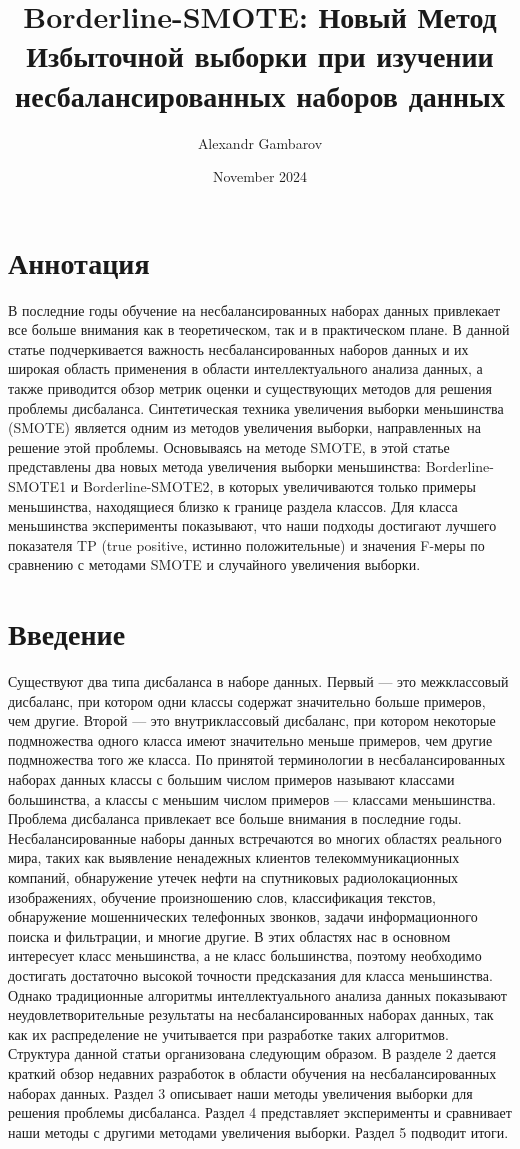 \documentclass{article}
\title{Borderline-SMOTE: Новый Метод Избыточной выборки при изучении несбалансированных наборов данных}
\author{Alexandr Gambarov}
\date{November 2024}
\begin{document}
\maketitle

\section*{Аннотация}

В последние годы обучение на несбалансированных наборах данных привлекает все больше внимания как в теоретическом, так и в практическом плане. В данной статье подчеркивается важность несбалансированных наборов данных и их широкая область применения в области интеллектуального анализа данных, а также приводится обзор метрик оценки и существующих методов для решения проблемы дисбаланса. Синтетическая техника увеличения выборки меньшинства (SMOTE) является одним из методов увеличения выборки, направленных на решение этой проблемы. Основываясь на методе SMOTE, в этой статье представлены два новых метода увеличения выборки меньшинства: Borderline-SMOTE1 и Borderline-SMOTE2, в которых увеличиваются только примеры меньшинства, находящиеся близко к границе раздела классов. Для класса меньшинства эксперименты показывают, что наши подходы достигают лучшего показателя TP (true positive, истинно положительные) и значения F-меры по сравнению с методами SMOTE и случайного увеличения выборки. 
\pagebreak
\section{Введение}
Существуют два типа дисбаланса в наборе данных. Первый — это межклассовый дисбаланс, при котором одни классы содержат значительно больше примеров, чем другие. Второй — это внутриклассовый дисбаланс, при котором некоторые подмножества одного класса имеют значительно меньше примеров, чем другие подмножества того же класса. По принятой терминологии в несбалансированных наборах данных классы с большим числом примеров называют классами большинства, а классы с меньшим числом примеров — классами меньшинства.
Проблема дисбаланса привлекает все больше внимания в последние годы. Несбалансированные наборы данных встречаются во многих областях реального мира, таких как выявление ненадежных клиентов телекоммуникационных компаний, обнаружение утечек нефти на спутниковых радиолокационных изображениях, обучение произношению слов, классификация текстов, обнаружение мошеннических телефонных звонков, задачи информационного поиска и фильтрации, и многие другие. В этих областях нас в основном интересует класс меньшинства, а не класс большинства, поэтому необходимо достигать достаточно высокой точности предсказания для класса меньшинства. Однако традиционные алгоритмы интеллектуального анализа данных показывают неудовлетворительные результаты на несбалансированных наборах данных, так как их распределение не учитывается при разработке таких алгоритмов.
Структура данной статьи организована следующим образом. В разделе 2 дается краткий обзор недавних разработок в области обучения на несбалансированных наборах данных. Раздел 3 описывает наши методы увеличения выборки для решения проблемы дисбаланса. Раздел 4 представляет эксперименты и сравнивает наши методы с другими методами увеличения выборки. Раздел 5 подводит итоги.
\end{document}
